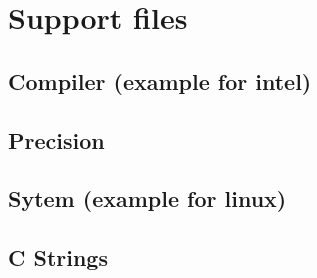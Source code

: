 \documentclass{article}
\begin{document}
\section{Support files}
\subsection{Compiler (example for intel)}
\label{fil:compiler}



\subsection{Precision}
\label{fil:precision}


\subsection{Sytem (example for linux)}
\label{fil:system}


\subsection{C Strings}
\label{fil:cstrings}
\end{document}
